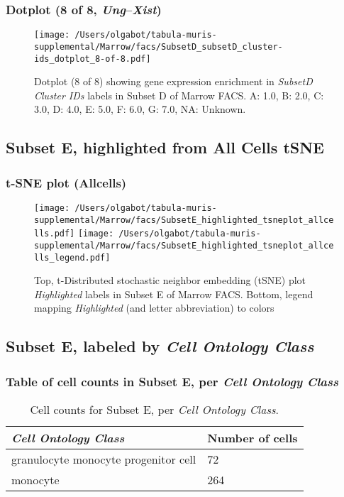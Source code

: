 \clearpage

\subsubsection{Dotplot (8 of 8, \emph{Ung}--\emph{Xist})}
\begin{figure}[h]
\centering
\texttt{[image: /Users/olgabot/tabula-muris-supplemental/Marrow/facs/SubsetD\_subsetD\_cluster-ids\_dotplot\_8-of-8.pdf]}

\caption{ Dotplot (8 of 8)  showing gene expression enrichment in \emph{SubsetD Cluster IDs} labels in Subset D of Marrow FACS. A: 1.0, B: 2.0, C: 3.0, D: 4.0, E: 5.0, F: 6.0, G: 7.0, NA: Unknown.}
\end{figure}


\clearpage

\subsection{Subset E, highlighted from All Cells tSNE}

\subsubsection{t-SNE plot (Allcells)}
\begin{figure}[h]
\centering
\texttt{[image: /Users/olgabot/tabula-muris-supplemental/Marrow/facs/SubsetE\_highlighted\_tsneplot\_allcells.pdf]}
\texttt{[image: /Users/olgabot/tabula-muris-supplemental/Marrow/facs/SubsetE\_highlighted\_tsneplot\_allcells\_legend.pdf]}
\caption{Top, t-Distributed stochastic neighbor embedding (tSNE) plot  \emph{Highlighted} labels in Subset E of Marrow FACS. Bottom, legend mapping \emph{Highlighted} (and letter abbreviation) to colors}
\end{figure}


\clearpage

\subsection{Subset E, labeled by \emph{Cell Ontology Class}}
\subsubsection{Table of cell counts in Subset E, per \emph{Cell Ontology Class}}\begin{table}[h]
\centering
\label{my-label}
\begin{tabular}{@{}ll@{}}
\toprule

\emph{Cell Ontology Class}& Number of cells \\ \midrule
granulocyte monocyte progenitor cell & 72 \\

monocyte & 264 \\
\bottomrule
\end{tabular}
\caption{Cell counts for Subset E, per \emph{Cell Ontology Class}.}
\end{table}


